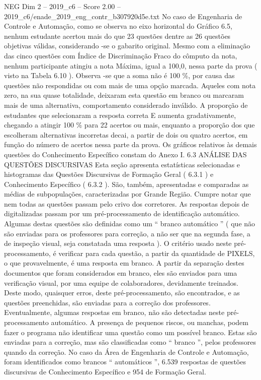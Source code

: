 \begin{textsample}{NEG Dim 2 – 2019\_c6 – Score 2.00 – 2019\_c6/enade\_2019\_eng\_contr\_b307920d5e.txt}
No caso de Engenharia de Controle e Automação, como se observa no eixo horizontal do Gráfico 6.5, nenhum estudante acertou mais do que 23 questões dentre as 26 questões objetivas válidas, considerando -se o gabarito original.
Mesmo com a eliminação das cinco questões com Índice de Discriminação Fraco do cômputo da nota, nenhum participante atingiu a nota Máxima, igual a 100,0, nessa parte da prova ( visto na Tabela 6.10 ).
Observa -se que a soma não é 100 \%, por causa das questões não respondidas ou com mais de uma opção marcada.
Aqueles com nota zero, na sua quase totalidade, deixaram esta questão em branco ou marcaram mais de uma alternativa, comportamento considerado inválido.
A proporção de estudantes que selecionaram a resposta correta E aumenta gradativamente, chegando a atingir 100 \% para 22 acertos ou mais, enquanto a proporção dos que escolheram alternativas incorretas decai, a partir de dois ou quatro acertos, em função do número de acertos nessa parte da prova.
Os gráficos relativos às demais questões do Conhecimento Específico constam do Anexo I. 6.3 ANÁLISE DAS QUESTÕES DISCURSIVAS Esta seção apresenta estatísticas selecionadas e histogramas das Questões Discursivas de Formação Geral ( 6.3.1 ) e Conhecimento Específico ( 6.3.2 ).
São, também, apresentadas e comparadas as médias de subpopulações, caracterizadas por Grande Região.
Cumpre notar que nem todas as questões passam pelo crivo dos corretores.
As respostas depois de digitalizadas passam por um pré-processamento de identificação automático.
Algumas destas questões são definidas como um “ branco automático ” ( que não são enviadas para os professores para correção, a não ser que na segunda fase, a de inspeção visual, seja constatada uma resposta ).
O critério usado neste pré-processamento, é verificar para cada questão, a partir da quantidade de PIXELS, o que provavelmente, é uma resposta em branco.
A partir da separação destes documentos que foram considerados em branco, eles são enviados para uma verificação visual, por uma equipe de colaboradores, devidamente treinados.
Deste modo, quaisquer erros, deste pré-processamento, são encontrados, e as questões preenchidas, são enviadas para a correção dos professores.
Eventualmente, algumas respostas em branco, não são detectadas neste pré-processamento automático.
A presença de pequenos riscos, ou manchas, podem fazer o programa não identificar uma questão como um possível branco.
Estas são enviadas para a correção, mas são classificadas como “ branco ”, pelos professores quando da correção.
No caso da Área de Engenharia de Controle e Automação, foram identificados como brancos “ automáticos ”, 6.539 respostas de questões discursivas de Conhecimento Específico e 954 de Formação Geral.

\end{textsample}
